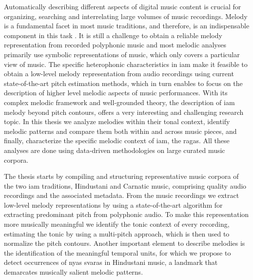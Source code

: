 
Automatically describing different aspects of digital music content is crucial for organizing, searching and interrelating large volumes of music recordings. Melody is a fundamental facet in most music traditions, and therefore, is an indispensable component in this task . It is still a challenge  to obtain a reliable melody representation from recorded polyphonic music and most melodic analyses primarily use symbolic representations of music, which only covers a particular view of music. The specific heterophonic characteristics in \gls{iam} make it feasible to obtain a low-level melody representation from audio recordings using current state-of-the-art pitch estimation methods, which in turn enables to focus on the description of higher level melodic aspects of music performances. With its complex melodic framework and well-grounded theory, the description of \gls{iam} melody  beyond pitch contours, offers a very interesting and challenging research topic. In this thesis we analyze melodies within their tonal context, identify melodic patterns and compare them both within and across music pieces, and finally, characterize the specific melodic context of \gls{iam}, the \glspl{raga}. All these analyses are done using data-driven methodologies on large curated music corpora. 

The thesis starts by compiling and structuring representative music corpora of the two \gls{iam} traditions, Hindustani and Carnatic music, comprising quality audio recordings and the associated metadata. From the music recordings we extract low-level melody representations by using a state-of-the-art algorithm for extracting predominant pitch from polyphonic audio. To make this representation more musically meaningful we identify the tonic context of every recording, estimating the  tonic by using a multi-pitch approach, which is then used to normalize the pitch contours. Another important element to describe melodies is the identification of the meaningful temporal units, for which we propose to detect occurrences of \gls{nyas} \glspl{svara} in Hindustani music, a landmark that demarcates musically salient melodic patterns.

